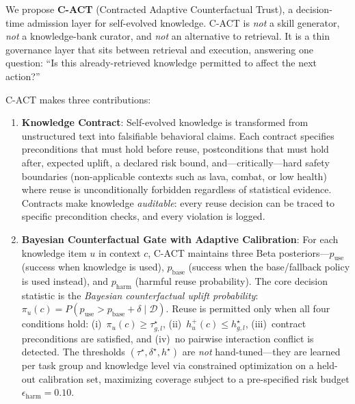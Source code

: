 \documentclass[letterpaper]{article}
\begin{document}
We propose \textbf{\textsc{C-ACT}} (Contracted Adaptive Counterfactual Trust), a decision-time admission layer for self-evolved knowledge. \textsc{C-ACT} is \emph{not} a skill generator, \emph{not} a knowledge-bank curator, and \emph{not} an alternative to retrieval. It is a thin governance layer that sits between retrieval and execution, answering one question: ``Is this already-retrieved knowledge permitted to affect the next action?''

\textsc{C-ACT} makes three contributions:

\begin{enumerate}
    \item \textbf{Knowledge Contract}: Self-evolved knowledge is transformed from unstructured text into falsifiable behavioral claims. Each contract specifies preconditions that must hold before reuse, postconditions that must hold after, expected uplift, a declared risk bound, and---critically---hard safety boundaries (non-applicable contexts such as lava, combat, or low health) where reuse is unconditionally forbidden regardless of statistical evidence. Contracts make knowledge \emph{auditable}: every reuse decision can be traced to specific precondition checks, and every violation is logged.

    \item \textbf{Bayesian Counterfactual Gate with Adaptive Calibration}: For each knowledge item $u$ in context $c$, \textsc{C-ACT} maintains three Beta posteriors---$p_{\text{use}}$ (success when knowledge is used), $p_{\text{base}}$ (success when the base/fallback policy is used instead), and $p_{\text{harm}}$ (harmful reuse probability). The core decision statistic is the \emph{Bayesian counterfactual uplift probability}: $\pi_u(c) = P(p_{\text{use}} > p_{\text{base}} + \delta \mid \mathcal{D})$. Reuse is permitted only when all four conditions hold: (i)~$\pi_u(c) \ge \tau^\star_{g,l}$, (ii)~$h_u^+(c) \le h^\star_{g,l}$, (iii)~contract preconditions are satisfied, and (iv)~no pairwise interaction conflict is detected. The thresholds $(\tau^\star, \delta^\star, h^\star)$ are \emph{not} hand-tuned---they are learned per task group and knowledge level via constrained optimization on a held-out calibration set, maximizing coverage subject to a pre-specified risk budget $\epsilon_{\text{harm}} = 0.10$.


\end{enumerate}
\end{document}
